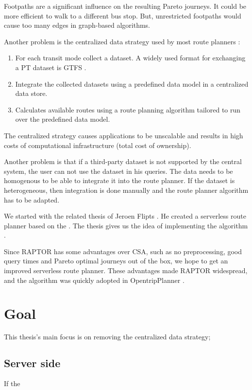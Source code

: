 Footpaths are a significant influence on the resulting Pareto journeys. It could be more efficient to walk to a different bus stop. But, unrestricted footpaths would cause too many edges in graph-based algorithms.

Another problem is the centralized data strategy used by most route planners \cite{rojas_melendez_julian_andres_decentralized_2020}:
\begin{enumerate}
    \item For each transit mode collect a dataset. A widely used format for exchanging a PT dataset is GTFS \cite{noauthor_gtfs_2022}.
    \item Integrate the collected datasets using a predefined data model in a centralized data store.
    \item Calculates available routes using a route planning algorithm tailored to run over the predefined data model.
\end{enumerate}

The centralized strategy causes applications to be unscalable and results in high costs of computational infrastructure (total cost of ownership). 

Another problem is that if a third-party dataset is not supported by the central system, the user can not use the dataset in his queries. The data needs to be homogenous to be able to integrate it into the route planner. If the dataset is heterogeneous, then integration is done manually and the route planner algorithm has to be adapted.



We started with the related thesis of Jeroen Flipts \cite{flipts_fragmenting_2020}. He created a serverless route planner based on the  \cite{dibbelt_intriguingly_2013}. The thesis gives us the idea of implementing the  algorithm \cite{delling_round-based_2015}.

Since RAPTOR has some advantages over CSA, such as no preprocessing, good query times and Pareto optimal journeys out of the box, we hope to get an improved serverless route planner. These advantages made RAPTOR widespread, and the algorithm was quickly adopted in OpentripPlanner \cite{noauthor_otp_2023}.

\section{Goal}

This thesis's main focus is on removing the centralized data strategy;
\subsection{Server side}
If the 


